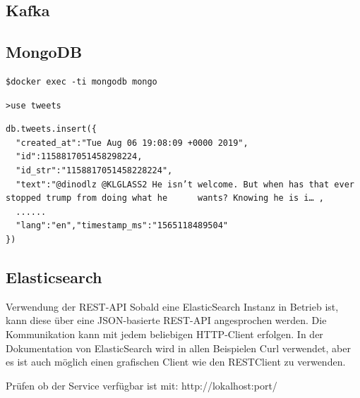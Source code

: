 \subsection{Kafka}


\subsection{MongoDB}


\begin{lstlisting}[float=h,frame=tb,caption={Befehl um Docker Container aufzurufen und MongoDB shell au starten},label=lst:docker_call_mongo]
		$docker exec -ti mongodb mongo
\end{lstlisting}

\begin{lstlisting}[float=h,frame=tb,caption={Befehl um zur tweets Datenbank zu wecheln},label=lst:chnage_db]
		>use tweets
\end{lstlisting}

\begin{lstlisting}[float=h,frame=tb,caption={Befehl um Tweet Dokumente in  Tweets Collection zu schreiben},label=lst:insert_collection]
db.tweets.insert({
  "created_at":"Tue Aug 06 19:08:09 +0000 2019",
  "id":1158817051458298224,
  "id_str":"1158817051458228224",
  "text":"@dinodlz @KLGLASS2 He isn’t welcome. But when has that ever stopped trump from doing what he  	wants? Knowing he is i… ,
  ......
  "lang":"en","timestamp_ms":"1565118489504"
})
\end{lstlisting}


\subsection{Elasticsearch}
Verwendung der REST-API
Sobald eine ElasticSearch Instanz in Betrieb ist, kann diese über eine JSON-basierte REST-API angesprochen werden. Die Kommunikation kann mit jedem beliebigen HTTP-Client erfolgen. In der Dokumentation von ElasticSearch wird in allen Beispielen Curl verwendet, aber es ist auch möglich einen grafischen Client wie den RESTClient zu verwenden. 

Prüfen ob der Service verfügbar ist mit: http://lokalhost:port/

